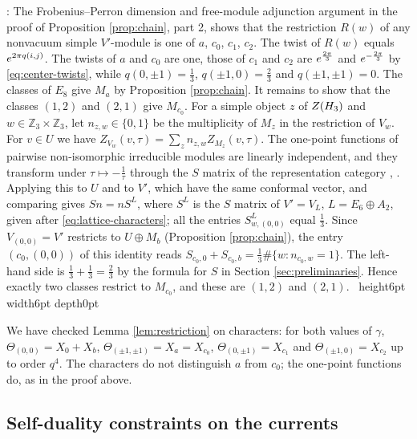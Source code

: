 \documentclass[leqno]{article}
\let\cal\relax
\newcommand{\cal}{\mathcal}
\newcommand{\Z}{\ensuremath{\mathbb{Z}}}
\newcommand{\qed}{\hfill \vrule height6pt  width6pt depth0pt}
\let\i\relax
\newcommand{\i}{\mathrm{i}}
\newenvironment{proof}[1][]{\noindent {\it Proof #1} : }{\hbox{~}\qed
\smallskip
}
\numberwithin{equation}{section}
\begin{document}
\begin{proof}
The Frobenius--Perron dimension and free-module adjunction argument in the proof of Proposition \ref{prop:chain}, part 2, shows that the restriction $R(w)$ of any nonvacuum simple $V'$-module is one of $a$, $c_0$, $c_1$, $c_2$. The twist of $R(w)$ equals $e^{2\pi\i q(i,j)}$. The twists of $a$ and $c_0$ are one, those of $c_1$ and $c_2$ are $e^{\frac{2\pi\i}{3}}$ and $e^{-\frac{2\pi\i}{3}}$ by \eqref{eq:center-twists}, while $q(0,\pm 1) = \frac13$, $q(\pm 1,0) = \frac23$ and $q(\pm 1,\pm 1) = 0$. The classes of $E_8$ give $M_a$ by Proposition \ref{prop:chain}. It remains to show that the classes $(1,2)$ and $(2,1)$ give $M_{c_0}$. For a simple object $z$ of $Z(\cal H_3)$ and $w \in \Z_3 \times \Z_3$, let $n_{z,w} \in \{0,1\}$ be the multiplicity of $M_z$ in the restriction of $V_w$. For $v \in U$ we have $Z_{V_w}(v,\tau) = \sum_z n_{z,w}Z_{M_z}(v,\tau)$. The one-point functions of pairwise non-isomorphic irreducible modules are linearly independent, and they transform under $\tau \mapsto -\frac{1}{\tau}$ through the $S$ matrix of the representation category \cite[Section 5]{Zhu96}, \cite{Hua08}. Applying this to $U$ and to $V'$, which have the same conformal vector, and comparing gives $S n = n S^{L}$, where $S^L$ is the $S$ matrix of $V' = V_L$, $L = E_6 \oplus A_2$, given after \eqref{eq:lattice-characters}; all the entries $S^L_{w,(0,0)}$ equal $\frac13$. Since $V_{(0,0)} = V'$ restricts to $U \oplus M_b$ (Proposition \ref{prop:chain}), the entry $(c_0,(0,0))$ of this identity reads $S_{c_0,0}+S_{c_0,b} = \frac13 \#\{w : n_{c_0,w} = 1\}$. The left-hand side is $\frac13+\frac13 = \frac23$ by the formula for $S$ in Section \ref{sec:preliminaries}. Hence exactly two classes restrict to $M_{c_0}$, and these are $(1,2)$ and $(2,1)$.
\end{proof}

We have checked Lemma \ref{lem:restriction} on characters: for both values of $\gamma$, $\Theta_{(0,0)} = X_0+X_b$, $\Theta_{(\pm 1,\pm 1)} = X_a = X_{c_0}$, $\Theta_{(0,\pm 1)} = X_{c_1}$ and $\Theta_{(\pm 1,0)} = X_{c_2}$ up to order $q^4$. The characters do not distinguish $a$ from $c_0$; the one-point functions do, as in the proof above.

\subsection{Self-duality constraints on the currents}
\end{document}
